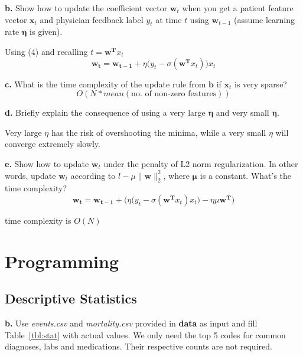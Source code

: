 \documentclass[12pt]{article}
\begin{document}
\textbf{b.} Show how to update the coefficient vector $\mathbf{w}_t$ when you get a patient feature vector $\mathbf{x}_t$ and physician feedback label $y_t$ at time $t$ using $\mathbf{w}_{t-1}$ (assume learning rate $\mathbf{\eta}$ is given).

\vspace{5mm}
Using (4) and recalling $ t = \mathbf{w^T}x_t $
\begin{equation}
  \mathbf{w_t} = \mathbf{w_{t-1}} + \eta\big(y_t - \sigma(\mathbf{w^T} x_t)\big)x_t
\end{equation}

\textbf{c.} What is the time complexity of the update rule from $\mathbf{b}$ if $\mathbf{x}_t$ is very sparse?
$$ O(N*mean(\text{no. of non-zero features})) $$

\textbf{d.} Briefly explain the consequence of using a very large $\mathbf{\eta}$ and very small $\mathbf{\eta}$.

\vspace{5mm}
Very large $\eta$ has the risk of overshooting the minima, while a very small
$\eta$ will converge extremely slowly.

\vspace{5mm}
\textbf{e.} Show how to update $\mathbf{w}_t$ under the penalty of L2 norm regularization. In other words, update $\mathbf{w}_t$ according to $l - \mu \|\mathbf{w}\|_2^2 $, where $\mathbf{\mu}$ is a constant. What's the time complexity?
\vspace{5mm}
\begin{equation}
  \mathbf{w_t} = \mathbf{w_{t-1}} + \bigg(\eta\big(y_t - \sigma(\mathbf{w^T}
  x_t)x_t\big) - \eta\mu\mathbf{w^T}\bigg)
\end{equation}

time complexity is $O(N)$
\vspace{5mm}

\newpage

\section{Programming}

\subsection{Descriptive Statistics}
\textbf{b.} Use \textit{events.csv} and \textit{mortality.csv} provided in \textbf{data} as input and fill Table~\ref{tbl:stat} with actual values. We only need the top 5 codes for common diagnoses, labs and medications. Their respective counts are not required.
\vspace{5mm}
\end{document}
